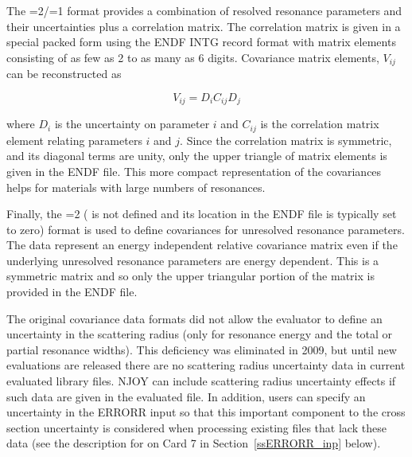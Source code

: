 The =2/=1 format provides a combination of resolved
resonance parameters and their uncertainties plus a correlation matrix.
The correlation matrix is given in a special packed form using the
ENDF INTG record format with matrix elements consisting of as few
as 2 to as many as 6 digits.  Covariance matrix elements,
$V_{ij}$ can be reconstructed as

\begin{equation}
  V_{ij} = D_iC_{ij}D_j
\end{equation}

\noindent
where $D_i$ is the uncertainty on parameter $i$ and $C_{ij}$ is the
correlation matrix element relating parameters $i$ and $j$.  Since
the correlation matrix is symmetric, and its diagonal terms are unity,
only the upper triangle of matrix elements is given in the ENDF file.
This more compact representation of the covariances helps for materials
with large numbers of resonances.

Finally, the =2 ( is not defined and its
location in the ENDF file is typically set to zero) format is used
to define covariances for unresolved resonance parameters.  The
data represent an energy independent relative covariance matrix
even if the underlying unresolved resonance parameters are energy
dependent.  This is a symmetric matrix and so only the upper
triangular portion of the matrix is provided in the ENDF file.

The original covariance data formats did not allow the evaluator to
define an uncertainty in the scattering radius (only for resonance
energy and the total or partial resonance widths).  This deficiency
was eliminated in 2009, but until new evaluations are released there
are no scattering radius uncertainty data in current evaluated
library files.  NJOY can include scattering radius uncertainty
effects if such data are given in the evaluated file.  In addition,
users can specify an uncertainty in the ERRORR input so that this
important component to the cross section uncertainty is considered
when processing existing files that lack these data (see the
description for  on Card 7 in Section~\ref{ssERRORR_inp} below).


